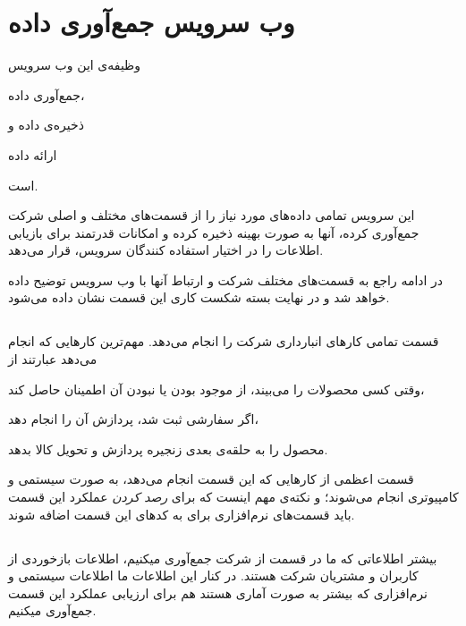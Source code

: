 \section{وب سرویس جمع‌آوری داده}\label{sec:gatherer}
وظیفه‌ی این وب سرویس
\begin{enumerate*}
\item 
جمع‌آوری داده،
\item 
ذخیره‌ی داده و
\item 
ارائه داده
\end{enumerate*}
است.

این سرویس تمامی داده‌های مورد نیاز را از قسمت‌های مختلف و اصلی شرکت جمع‌آوری کرده، آنها به صورت بهینه ذخیره کرده و امکانات قدرتمند برای بازیابی اطلاعات را در اختیار استفاده کنندگان سرویس، قرار می‌دهد.

در ادامه راجع به قسمت‌های مختلف شرکت و ارتباط آنها با وب سرویس توضیح داده خواهد شد و در نهایت بسته شکست کاری این قسمت نشان داده می‌شود.

\subsection{}\label{ssec:stock}
قسمت  تمامی کار‌‌های انبار‌داری شرکت را انجام می‌دهد. مهم‌ترین کار‌هایی که انجام می‌دهد عبارتند از
\begin{enumerate*}
\item 
وقتی کسی محصولات را می‌بیند، از موجود بودن یا نبودن‌ آن اطمینان حاصل کند،
\item 
اگر سفارشی ثبت شد، پردازش آن را انجام دهد،

\item 
محصول را به حلقه‌ی بعدی زنجیره پردازش و تحویل کالا بدهد.
\end{enumerate*}

قسمت اعظمی از کار‌هایی که این قسمت انجام می‌دهد، به صورت سیستمی و کامپیوتری انجام می‌شوند؛ و نکته‌ی مهم اینست که برای \textit{رصد کردن} عملکرد این قسمت باید قسمت‌های نرم‌افزاری برای  به کد‌های این قسمت اضافه شوند. 

\subsection{}\label{ssec:site}
بیشتر اطلاعاتی که ما در قسمت 
از شرکت جمع‌آوری میکنیم، اطلاعات بازخوردی از کاربران و مشتریان شرکت هستند. در کنار این اطلاعات ما اطلاعات سیستمی و نرم‌افزاری که بیشتر به صورت آماری هستند هم برای ارزیابی عملکرد این قسمت جمع‌آوری میکنیم.

